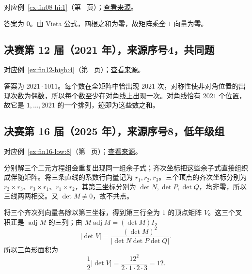\documentclass[UTF8,12pt,a4paper,fontset=fandol]{ctexart}
\begin{document}
对应例~\ref{ex:fin08-hi:1}（第~\pageref{ex:fin08-hi:1} 页）；\href{https://github.com/lzxcr/cmc-mathematics/blob/64916fa1fdbc3e444a652eca204d5669058ee321/src/problems/finals/08/01.md}{查看来源}。

\begin{solve}

答案为 $0$。由 Vieta 公式，四根之和为零，故矩阵乘全 $1$ 向量为零。

\end{solve}

\subsection{决赛第 12 届（2021 年），来源序号4，共同题}\label{ans:fin12-high:4}\label{pr:fin12-high:4}

对应例~\ref{ex:fin12-high:4}（第~\pageref{ex:fin12-high:4} 页）；\href{https://github.com/lzxcr/cmc-mathematics/blob/64916fa1fdbc3e444a652eca204d5669058ee321/src/problems/finals/12/04.md}{查看来源}。

\begin{solve}

答案为 $2021\cdot1011$。每个数在全矩阵中恰出现 $2021$ 次，对称性使非对角位置的出现次数为偶数，所以每个数至少在对角线上出现一次。对角线恰有 $2021$ 个位置，故它是 $1,\ldots,2021$ 的一个排列，迹即为这些数之和。

\end{solve}

\subsection{决赛第 16 届（2025 年），来源序号8，低年级组}\label{ans:fin16-low:8}\label{pr:fin16-low:8}

对应例~\ref{ex:fin16-low:8}（第~\pageref{ex:fin16-low:8} 页）；\href{https://github.com/lzxcr/cmc-mathematics/blob/64916fa1fdbc3e444a652eca204d5669058ee321/src/problems/finals/16/08.md}{查看来源}。

\begin{solve}

分别解三个二元方程组会重复出现同一组余子式；齐次坐标把这些余子式直接组织成伴随矩阵。将三条直线的系数行向量记为 $r_1,r_2,r_3$。三个顶点的齐次坐标分别为 $r_2\times r_3$、$r_3\times r_1$、$r_1\times r_2$，其第三坐标分别为 $\det N,\det P,\det Q$，均非零，所以三线两两相交。又 $\det M\ne0$，故不共点。

将三个齐次列向量各除以第三坐标，得到第三行全为 $1$ 的顶点矩阵 $V$。这三个叉积正是 $\operatorname{adj}M$ 的三列；由 $M\operatorname{adj}M=(\det M)I$，
\[
|\det V|=\frac{(\det M)^2}{|\det N\det P\det Q|}.
\]
所以三角形面积为
\[
\boxed{\frac12|\det V|=\frac{12^2}{2\cdot1\cdot2\cdot3}=12}.
\]

\end{solve}
\end{document}
